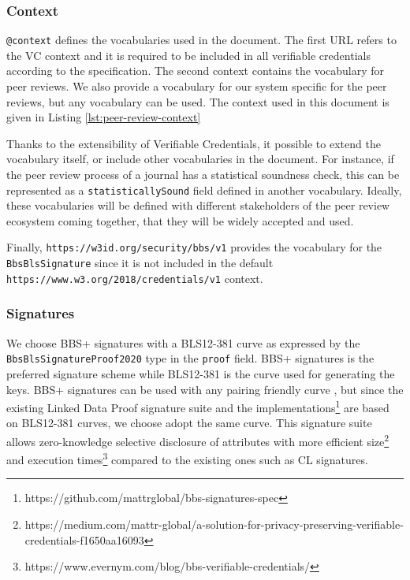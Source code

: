 \subsubsection{Context}

\lstinline{@context} defines the vocabularies used in the document. The first URL refers to the VC context and it is required to be included in all verifiable credentials according to the specification. The second context contains the vocabulary for peer reviews. We also provide a vocabulary for our system specific for the peer reviews, but any vocabulary can be used. The context used in this document is given in Listing \ref{lst:peer-review-context}




Thanks to the extensibility of Verifiable Credentials, it possible to extend the vocabulary itself, or include other vocabularies in the document. For instance, if the peer review process of a journal has a statistical soundness check, this can be represented as a \lstinline{statisticallySound} field defined in another vocabulary. Ideally, these vocabularies will be defined with different stakeholders of the peer review ecosystem coming together, that they will be widely accepted and used.

Finally, \lstinline{https://w3id.org/security/bbs/v1} provides the vocabulary for the \lstinline{BbsBlsSignature} since it is not included in the default \lstinline{https://www.w3.org/2018/credentials/v1} context.

\subsubsection{Signatures}

We choose BBS+ signatures with a BLS12-381 curve as expressed by the \lstinline{BbsBlsSignatureProof2020} type in the \lstinline{proof} field. BBS+ signatures is the preferred signature scheme while BLS12-381 is the curve used for generating the keys. BBS+ signatures can be used with any pairing friendly curve \parencite{irtf-cfrg-pairing-friendly-curves-09}, but since the existing Linked Data Proof signature suite \parencite{looker_steele_2021} and the implementations\footnote{https://github.com/mattrglobal/bbs-signatures-spec} are based on BLS12-381 curves, we choose adopt the same curve. This signature suite allows zero-knowledge selective disclosure of attributes with more efficient size\footnote{https://medium.com/mattr-global/a-solution-for-privacy-preserving-verifiable-credentials-f1650aa16093} and execution times\footnote{https://www.evernym.com/blog/bbs-verifiable-credentials/} compared to the existing ones such as \acrshort{CL} signatures.

